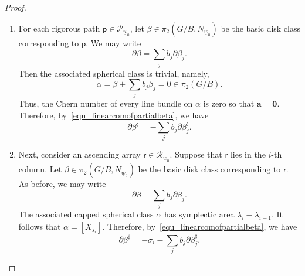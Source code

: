 \documentclass[11pt]{amsart}
\theoremstyle{plain}
\theoremstyle{definition}
\theoremstyle{remark}
\numberwithin{equation}{section} \numberwithin{table}{section}
\numberwithin{equation}{section}
\begin{document}
\begin{proof}
\begin{enumerate}
\item For each rigorous path $\mathsf{p} \in \mathcal{P}_{\underline{w}_0}$, let $\beta \in \pi_2(G/B,N_{\underline{w}_0})$ be the basic disk class corresponding to $\mathsf{p}$. We may write 
$$
\partial \beta = \sum_{j} b_j  \partial\beta_j.
$$
Then the associated spherical class is trivial, namely, 
$$
\alpha = \beta + \sum_{j} b_j \beta_j = 0 \in \pi_2(G/B).
$$
Thus, the Chern number of every line bundle on $\alpha$ is zero so that $\mathbf{a} = \mathbf{0}$. Therefore, by~\eqref{equ_linearcomofpartialbeta}, we have 
\begin{equation}\label{equ_111}
\partial \beta^\sharp = - \sum_{j} b_j \partial \beta_j^\sharp.
\end{equation}
\item Next, consider an ascending array $\mathsf{r} \in \mathcal{R}_{\underline{w}_0}$. Suppose that $\mathsf{r}$ lies in the $i$-th column. Let $\beta \in \pi_2(G/B, N_{\underline{w}_0})$ be the basic disk class corresponding to $\mathsf{r}$. As before, we may write 
$$
\partial \beta = \sum_{j} b_j \partial \beta_j.
$$
The associated capped spherical class $\alpha$ has symplectic area $\lambda_i - \lambda_{i+1}$. It follows that $\alpha = [X_{s_i}]$. Therefore, by~\eqref{equ_linearcomofpartialbeta}, we have
\begin{equation}\label{equ_222}
\partial \beta^\sharp = - \sigma_i - \sum_{j} b_j \partial \beta_j^\sharp.
\end{equation}
\end{enumerate}


\end{proof}
\end{document}
